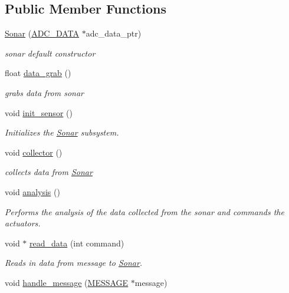 \subsection*{Public Member Functions}
\begin{DoxyCompactItemize}
\item 
\hyperlink{classSonar_a152453d934da6d4e576f9d59dc80b762}{Sonar} (\hyperlink{SUBSYS__COMMANDS_8h_a0be7f6e3de248ca3bdb1f3f5a0819c62}{A\-D\-C\-\_\-\-D\-A\-T\-A} $\ast$adc\-\_\-data\-\_\-ptr)
\begin{DoxyCompactList}\small\item\em sonar default constructor \end{DoxyCompactList}\item 
float \hyperlink{classSonar_aa4e807cbed15ce1d46ddcef05b6b59fb}{data\-\_\-grab} ()
\begin{DoxyCompactList}\small\item\em grabs data from sonar \end{DoxyCompactList}\item 
void \hyperlink{classSonar_af91d04cbc441084ba608a49c2be88d5b}{init\-\_\-sensor} ()
\begin{DoxyCompactList}\small\item\em Initializes the \hyperlink{classSonar}{Sonar} subsystem. \end{DoxyCompactList}\item 
void \hyperlink{classSonar_a38b0e409082be17e7098b2e471bab4a8}{collector} ()
\begin{DoxyCompactList}\small\item\em collects data from \hyperlink{classSonar}{Sonar} \end{DoxyCompactList}\item 
void \hyperlink{classSonar_a11a32c64528f8e69fdde4722f3b3bc7b}{analysis} ()
\begin{DoxyCompactList}\small\item\em Performs the analysis of the data collected from the sonar and commands the actuators. \end{DoxyCompactList}\item 
void $\ast$ \hyperlink{classSonar_a54f55470741873f333ad8af8a98affc8}{read\-\_\-data} (int command)
\begin{DoxyCompactList}\small\item\em Reads in data from message to \hyperlink{classSonar}{Sonar}. \end{DoxyCompactList}\item 
void \hyperlink{classSonar_a5f9b0f57b5a05b03b0dcb5ab830592ff}{handle\-\_\-message} (\hyperlink{SUBSYS__COMMANDS_8h_ad814416fc1a8c675bea2687d96088a8f}{M\-E\-S\-S\-A\-G\-E} $\ast$message)

\end{DoxyCompactItemize}
